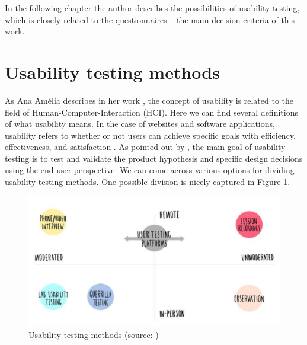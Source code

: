 \documentclass[a4paper,10pt,twoside]{article}
\begin{document}
\noindent In the following chapter the author describes the
possibilities of usability testing, which is closely related to the
questionnaires -- the main decision criteria of this work.

\newpage
\vspace*{-1cm}
\section{Usability testing methods}
\label{sec:usability_testing}

\noindent As Ana Amélia describes in her work \cite{amelia}, the
concept of usability is related to the field of
Human-Computer-Interaction (HCI). Here we can find several definitions
of what usability means. In the case of websites and software
applications, usability refers to whether or not users can achieve
specific goals with efficiency, effectiveness, and satisfaction
\cite{dishman}. As pointed out by \cite{hotjar}, the main goal of
usability testing is to test and validate the product hypothesis and
specific design decisions using the end-user perspective. We can come
across various options for dividing usability testing methods. One
possible division is nicely captured in Figure
\ref{fig:usability_testing_methods}.

\vspace{0.3cm}
\begin{figure}[hbt!] 
\begin{center}
\includegraphics[width=15cm]{../pictures/usability_testing_methods.png} 
\caption[Usability testing methods]{Usability testing methods (source: \cite{hotjar})}
\label{fig:usability_testing_methods}
\end{center}
\end{figure}
\end{document}
